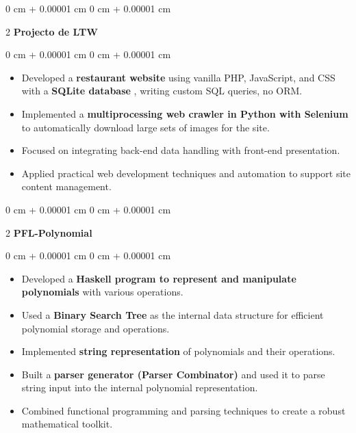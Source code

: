 \documentclass[10pt, letterpaper]{article}
\newenvironment{highlights}{
        \begin{itemize}[
            topsep=0.10 cm,
            parsep=0.10 cm,
            partopsep=0pt,
            itemsep=0pt,
            leftmargin=0 cm + 10pt
        ]
    }{
        \end{itemize}
    } %
\newenvironment{onecolentry}{
        \begin{adjustwidth}{
            0 cm + 0.00001 cm
        }{
            0 cm + 0.00001 cm
        }
    }{
        \end{adjustwidth}
    } %
\newenvironment{twocolentry}[2][]{
        \onecolentry
        \def\secondColumn{#2}
        \setcolumnwidth{\fill, 6.5cm}
        \begin{paracol}{2}
    }{
        \switchcolumn \raggedleft \secondColumn
        \end{paracol}
        \endonecolentry
    } %
\begin{document}
\vspace{0.2 cm}
\begin{twocolentry}{ }\textbf{Projecto de LTW}\end{twocolentry}\vspace{0.10 cm}\begin{onecolentry}\begin{highlights}
\item Developed a  \textbf{restaurant website}  using vanilla PHP, JavaScript, and CSS with a  \textbf{SQLite database} , writing custom SQL queries, no ORM.

\item Implemented a  \textbf{multiprocessing web crawler in Python with Selenium}  to automatically download large sets of images for the site.

\item Focused on integrating back-end data handling with front-end presentation.

\item Applied practical web development techniques and automation to support site content management.

\end{highlights} \end{onecolentry}
\vspace{0.2 cm}
\begin{twocolentry}{ }\textbf{PFL-Polynomial}\end{twocolentry}\vspace{0.10 cm}\begin{onecolentry}\begin{highlights}
\item Developed a  \textbf{Haskell program to represent and manipulate polynomials}  with various operations.

\item Used a  \textbf{Binary Search Tree}  as the internal data structure for efficient polynomial storage and operations.

\item Implemented  \textbf{string representation}  of polynomials and their operations.

\item Built a  \textbf{parser generator (Parser Combinator)}  and used it to parse string input into the internal polynomial representation.

\item Combined functional programming and parsing techniques to create a robust mathematical toolkit.

\end{highlights} \end{onecolentry}
\end{document}
